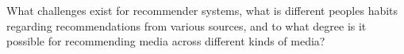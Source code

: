 What challenges exist for recommender systems, what is different peoples habits regarding recommendations from various sources, and to what degree is it possible for recommending media across different kinds of media?